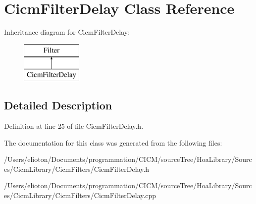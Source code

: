 \hypertarget{class_cicm_filter_delay}{\section{Cicm\-Filter\-Delay Class Reference}
\label{class_cicm_filter_delay}
}
Inheritance diagram for Cicm\-Filter\-Delay\-:\begin{figure}[H]
\begin{center}
\leavevmode
\includegraphics[height=2.000000cm]{class_cicm_filter_delay}
\end{center}
\end{figure}


\subsection{Detailed Description}


Definition at line 25 of file Cicm\-Filter\-Delay.\-h.



The documentation for this class was generated from the following files\-:\begin{DoxyCompactItemize}
\item 
/\-Users/elioton/\-Documents/programmation/\-C\-I\-C\-M/source\-Tree/\-Hoa\-Library/\-Sources/\-Cicm\-Library/\-Cicm\-Filters/Cicm\-Filter\-Delay.\-h\item 
/\-Users/elioton/\-Documents/programmation/\-C\-I\-C\-M/source\-Tree/\-Hoa\-Library/\-Sources/\-Cicm\-Library/\-Cicm\-Filters/Cicm\-Filter\-Delay.\-cpp\end{DoxyCompactItemize}
